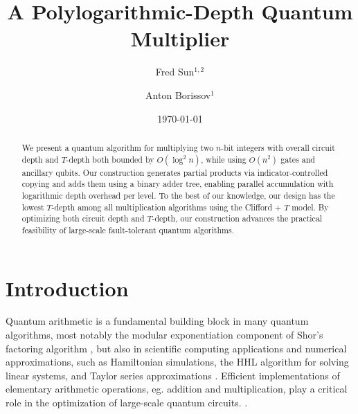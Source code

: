 \documentclass[reprint,amsmath,amssymb,aps,pra]{revtex4-2}
\begin{document}

\title{A Polylogarithmic-Depth Quantum Multiplier}%
\author{Fred Sun${}^{1,2}$}
\author{Anton Borissov${}^{1}$}

\newcommand{\anton}[1]{{\color{red}(anton): #1}}
\newcommand{\fred}[1]{{\color{blue}(fred): #1}}

\date{\today}
\begin{abstract}
We present a quantum algorithm for multiplying two $n$-bit integers with overall circuit depth and $T$-depth both bounded by $O(\log^{2} n)$, while using $O(n^{2})$ gates and ancillary qubits. Our construction generates partial products via indicator-controlled copying and adds them using a binary adder tree, enabling parallel accumulation with logarithmic depth overhead per level. To the best of our knowledge, our design has the lowest $T$-depth among all multiplication algorithms using the Clifford + $T$ model. By optimizing both circuit depth and $T$-depth, our construction advances the practical feasibility of large-scale fault-tolerant quantum algorithms.
\end{abstract}

\maketitle
\section{Introduction}

Quantum arithmetic is a fundamental building block in many quantum algorithms,
most notably the modular exponentiation component of Shor’s factoring algorithm \cite{Shor1997, pavlidis2013fastquantummodularexponentiation}, but also in scientific
computing applications and numerical approximations, such as Hamiltonian simulations, the HHL algorithm for solving linear systems, and Taylor series approximations \cite{Childs_2017, Harrow_2009, Berry_2015}.
Efficient implementations of elementary arithmetic operations, eg. addition and
multiplication, play a critical role in the optimization of large-scale quantum
circuits. 
\cite{wang2024comprehensivestudyquantumarithmetic,
cuccaro2004newquantumripplecarryaddition,
Draper2004, Ruiz_Perez_2017,
gidney2025classicalquantumadderconstantworkspace}.
\end{document}
